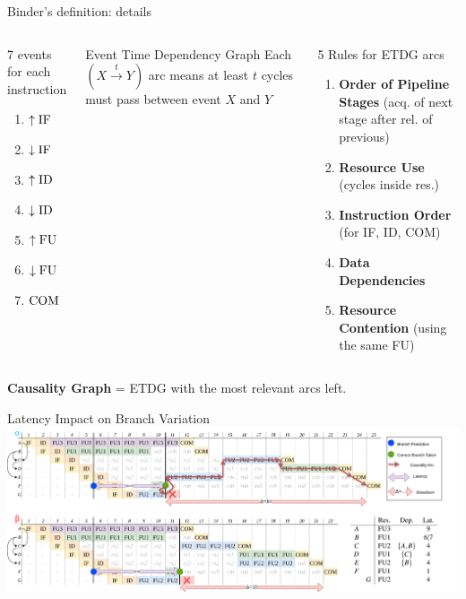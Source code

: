 \documentclass{beamer}
\begin{document}
\begin{frame}{Binder's definition: details}
    \begin{columns}
    \begin{block}{7 events for each instruction}
        \begin{enumerate}
            \item $\uparrow\mathrm{IF}$ 
            \item $\downarrow\mathrm{IF}$
            \item $\uparrow\mathrm{ID}$ 
            \item $\downarrow\mathrm{ID}$
            \item $\uparrow\mathrm{FU}$
            \item $\downarrow\mathrm{FU}$
            \item $\mathrm{COM}$
        \end{enumerate}
    \end{block}


    \begin{block}{Event Time Dependency Graph}
        Each $(X \xrightarrow{t} Y)$ arc means at least $t$ cycles must pass between event $X$ and $Y$
    \end{block}

    \begin{block}{5 Rules for ETDG arcs}
        \begin{enumerate}
            \item \textbf{Order of Pipeline Stages} (acq. of next stage after rel. of previous)
            \item \textbf{Resource Use} (cycles inside res.)
            \item \textbf{Instruction Order} (for IF, ID, COM)
            \item \textbf{Data Dependencies}
            \item \textbf{Resource Contention} (using the same FU)
        \end{enumerate}
        
    \end{block}

    \end{columns}

    \begin{block}{}
        \textbf{Causality Graph} = ETDG with the most relevant arcs left.    
    \end{block}
\end{frame}

\begin{frame}{Latency Impact on Branch Variation}
    \includegraphics[width=\textwidth]{pic/lat-mispred-alt-interpretation-1.png}
\end{frame}
\end{document}
